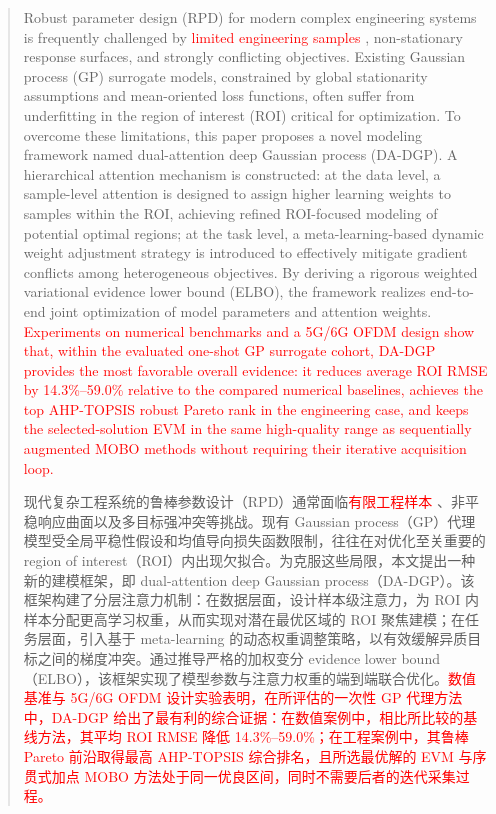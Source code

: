\documentclass[11pt]{article}
\begin{document}
	\begin{abstract}
Robust parameter design (RPD) for modern complex engineering systems is frequently challenged by \textcolor{red}{limited engineering samples}%
, non-stationary response surfaces, and strongly conflicting objectives. Existing Gaussian process (GP) surrogate models, constrained by global stationarity assumptions and mean-oriented loss functions, often suffer from underfitting in the region of interest (ROI) critical for optimization. To overcome these limitations, this paper proposes a novel modeling framework named dual-attention deep Gaussian process (DA-DGP). A hierarchical attention mechanism is constructed: at the data level, a sample-level attention is designed to assign higher learning weights to samples within the ROI, achieving refined ROI-focused modeling of potential optimal regions; at the task level, a meta-learning-based dynamic weight adjustment strategy is introduced to effectively mitigate gradient conflicts among heterogeneous objectives. By deriving a rigorous weighted variational evidence lower bound (ELBO), the framework realizes end-to-end joint optimization of model parameters and attention weights. \textcolor{red}{Experiments on numerical benchmarks and a 5G/6G OFDM design show that, within the evaluated one-shot GP surrogate cohort, DA-DGP provides the most favorable overall evidence: it reduces average ROI RMSE by 14.3\%--59.0\% relative to the compared numerical baselines, achieves the top AHP-TOPSIS robust Pareto rank in the engineering case, and keeps the selected-solution EVM in the same high-quality range as sequentially augmented MOBO methods without requiring their iterative acquisition loop.}%

现代复杂工程系统的鲁棒参数设计（RPD）通常面临\textcolor{red}{有限工程样本}%
、非平稳响应曲面以及多目标强冲突等挑战。现有 Gaussian process（GP）代理模型受全局平稳性假设和均值导向损失函数限制，往往在对优化至关重要的 region of interest（ROI）内出现欠拟合。为克服这些局限，本文提出一种新的建模框架，即 dual-attention deep Gaussian process（DA-DGP）。该框架构建了分层注意力机制：在数据层面，设计样本级注意力，为 ROI 内样本分配更高学习权重，从而实现对潜在最优区域的 ROI 聚焦建模；在任务层面，引入基于 meta-learning 的动态权重调整策略，以有效缓解异质目标之间的梯度冲突。通过推导严格的加权变分 evidence lower bound（ELBO），该框架实现了模型参数与注意力权重的端到端联合优化。\textcolor{red}{数值基准与 5G/6G OFDM 设计实验表明，在所评估的一次性 GP 代理方法中，DA-DGP 给出了最有利的综合证据：在数值案例中，相比所比较的基线方法，其平均 ROI RMSE 降低 14.3\%--59.0\%；在工程案例中，其鲁棒 Pareto 前沿取得最高 AHP-TOPSIS 综合排名，且所选最优解的 EVM 与序贯式加点 MOBO 方法处于同一优良区间，同时不需要后者的迭代采集过程。}%
	\end{abstract}
			
\end{document}
